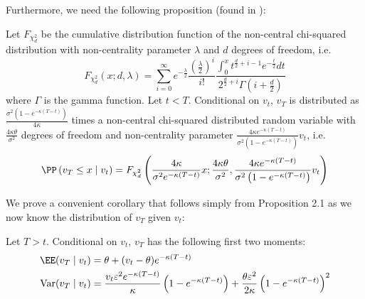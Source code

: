 \documentclass[11pt]{article}
\numberwithin{equation}{section}
\begin{document}
\newpage
Furthermore, we need the following proposition (found in \cite{cox1985theory}):
\begin{proposition}
Let $F_{\chi_{d}^{2}}$ be the cumulative distribution function of the non-central chi-squared distribution with non-centrality parameter $\lambda$ and $d$ degrees of freedom, i.e.
$$
F_{\chi_d^{2}}(x ; d, \lambda)=\sum_{i=0}^{\infty} e^{-\frac{\lambda}{2}} \frac{\left(\frac{\lambda}{2}\right)^{i}}{i!} \frac{\int_{0}^{x} t^{\frac{d}{2}+i-1} e^{-\frac{t}{2}} d t}{2^{\frac{d}{2}+i} \Gamma\left(i+\frac{d}{2}\right)}
$$
where $\Gamma$ is the gamma function. Let $t<T$. Conditional on $v_t$, $v_T$ is distributed as $\frac{\sigma^{2}\left(1-e^{-\kappa(T-t)}\right)}{4 \kappa}$ times a non-central chi-squared distributed random variable with $\frac{4 \kappa \theta}{\sigma^{2}}$ degrees of freedom and non-centrality parameter $\frac{4 \kappa e^{-\kappa(T-t)}}{\sigma^{2}\left(1-e^{-\kappa(T-t)}\right)} v_{t}$, i.e.
$$
\PP\left(v_T \leq x \mid v_t\right)=F_{\chi_d^{2}}\left(\frac{4 \kappa}{\sigma^{2} e^{-\kappa(T-t)}} x ; \frac{4 \kappa \theta}{\sigma^{2}}, \frac{4 \kappa e^{-\kappa(T-t)}}{\sigma^{2}\left(1-e^{-\kappa(T-t)}\right)} v_t\right)
$$
\end{proposition}

We prove a convenient corollary that follows simply from Proposition 2.1 as we now
know the distribution of $v_T$ given $v_t$:
\begin{corollary}
Let $T > t$. Conditional on $v_t$, $v_T$ has the following first two moments:
\begin{align*}
\EE(v_T \mid v_t) &= \theta + (v_t - \theta) e^{-\kappa(T-t)} \\
\operatorname{Var}(v_T \mid v_t) &= \frac{v_t \varepsilon^{2} e^{-\kappa(T-t)}}{\kappa}\left(1 - e^{-\kappa(T-t)}\right) + \frac{\theta \varepsilon^{2}}{2 \kappa}\left(1 - e^{-\kappa(T-t)}\right)^{2}
\end{align*}
\end{corollary}
\end{document}
